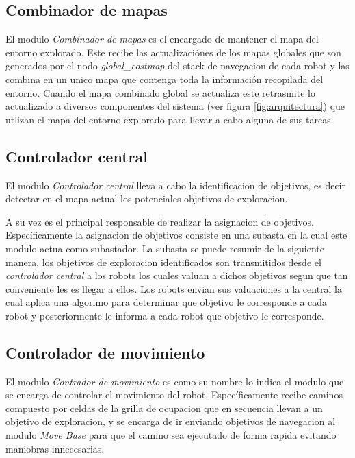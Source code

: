 \subsection{Combinador de mapas}
El modulo \emph{Combinador de mapas} es el encargado de mantener el mapa del entorno
explorado. Este recibe las actualizaciónes de los mapas globales que son
generados por el nodo \emph{global\_costmap} del stack de navegacion de cada
robot y las combina en un unico mapa que contenga toda la información
recopilada del entorno. Cuando el mapa combinado global se actualiza este
retrasmite lo actualizado a diversos componentes del sistema (ver figura
\ref{fig:arquitectura}) que utlizan el mapa del entorno explorado para llevar a
cabo alguna de sus tareas. 

\subsection{Controlador central}

El modulo \emph{Controlador central} lleva a cabo la identificacion de objetivos, es decir detectar en
el mapa actual los potenciales objetivos de exploracion. 

A su vez es el principal responsable de realizar la asignacion de objetivos.
Específicamente la asignacion de objetivos consiste en una subasta en la cual
este modulo actua como subastador. La subasta se puede resumir de la siguiente
manera, los objetivos de exploracion identificados son transmitidos desde el
\emph{controlador central} a los robots los cuales valuan a dichos objetivos segun que
tan conveniente les es llegar a ellos. Los robots envian sus valuaciones a la
central la cual aplica una algorimo para determinar que objetivo le corresponde
a cada robot y posteriormente le informa a cada robot que objetivo le
corresponde.




\subsection{Controlador de movimiento}
El modulo \emph{Contrador de movimiento} es como su nombre lo indica el modulo
que se encarga de controlar el movimiento del robot. Específicamente recibe
caminos compuesto por celdas de la grilla de ocupacion que en secuencia llevan
a un objetivo de exploracion, y se encarga de ir enviando objetivos de
navegacion al modulo \emph{Move Base} para que el camino sea ejecutado de forma
rapida evitando maniobras innecesarias.

